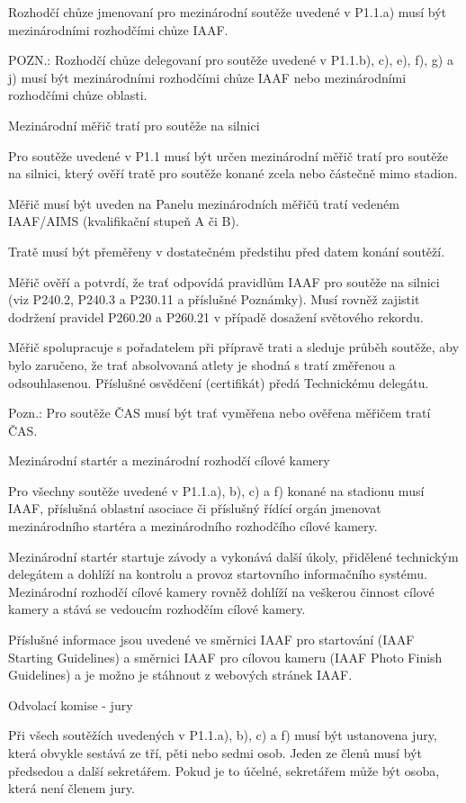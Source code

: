 Rozhodčí chůze jmenovaní pro mezinárodní soutěže uvedené v P1.1.a) musí být mezinárodními rozhodčími chůze IAAF.

POZN.: Rozhodčí chůze delegovaní pro soutěže uvedené v P1.1.b), c), e), f), g) a j) musí být mezinárodními rozhodčími chůze IAAF nebo mezinárodními rozhodčími chůze oblasti.

\secc Mezinárodní měřič tratí pro soutěže na silnici

Pro soutěže uvedené v P1.1 musí být určen mezinárodní měřič tratí pro soutěže na silnici, který ověří tratě pro soutěže konané zcela nebo částečně mimo stadion.

Měřič musí být uveden na Panelu mezinárodních měřičů tratí vedeném IAAF/AIMS (kvalifikační stupeň A či B).

Tratě musí být přeměřeny v dostatečném předstihu před datem konání soutěží.

Měřič ověří a potvrdí, že trať odpovídá pravidlům IAAF pro soutěže na silnici (viz P240.2, P240.3 a P230.11 a příslušné Poznámky).
Musí rovněž zajistit dodržení pravidel P260.20 a P260.21 v případě dosažení světového rekordu.

Měřič spolupracuje s pořadatelem při přípravě trati a sleduje průběh soutěže, aby bylo zaručeno, že trať absolvovaná atlety je shodná s tratí změřenou a odsouhlasenou.
Příslušné osvědčení (certifikát) předá Technickému delegátu.

Pozn.: Pro soutěže ČAS musí být trať vyměřena nebo ověřena měřičem tratí ČAS.

\secc Mezinárodní startér a mezinárodní rozhodčí cílové kamery

Pro všechny soutěže uvedené v P1.1.a), b), c) a f) konané na stadionu musí IAAF, příslušná oblastní asociace či příslušný řídící orgán jmenovat mezinárodního startéra a mezinárodního rozhodčího cílové kamery.

Mezinárodní startér startuje závody a vykonává další úkoly, přidělené technickým delegátem a dohlíží na kontrolu a provoz startovního informačního systému.
Mezinárodní rozhodčí cílové kamery rovněž dohlíží na veškerou činnost cílové kamery a stává se vedoucím rozhodčím cílové kamery.

Příslušné informace jsou uvedené ve směrnici IAAF pro startování (IAAF Starting Guidelines) a směrnici IAAF pro cílovou kameru (IAAF Photo Finish Guidelines) a je možno je stáhnout z webových stránek IAAF.

\secc Odvolací komise - jury

Při všech soutěžích uvedených v P1.1.a), b), c) a f) musí být ustanovena jury, která obvykle sestává ze tří, pěti nebo sedmi osob.
Jeden ze členů musí být předsedou a další sekretářem.
Pokud je to účelné, sekretářem může být osoba, která není členem jury.

